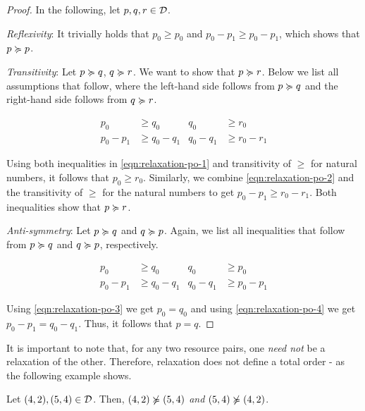 \begin{proof}
   In the following, let \(p, q, r \in \mathcal{D}\).

   \emph{Reflexivity}: It trivially holds that \(p_0 \geq p_0\) and \(p_0 - p_1 \geq p_0 - p_1\), which shows that \(p \succcurlyeq p\).

   \emph{Transitivity}: Let \(p \succcurlyeq q\), \(q \succcurlyeq r\). We want to show that \(p \succcurlyeq r\). Below we list all assumptions that follow, where the left-hand side follows from \(p \succcurlyeq q\) and the right-hand side follows from \(q \succcurlyeq r\).

   \begin{align}
      p_0         &\geq q_0               &  q_0      & \geq r_0 \label{eqn:relaxation-po-1}\\
      p_0 - p_1   &\geq q_0 - q_1         & q_0 - q_1 & \geq r_0 - r_1 \label{eqn:relaxation-po-2}
   \end{align}      

   Using both inequalities in \cref{eqn:relaxation-po-1} and transitivity of \(\geq\) for natural numbers, it follows that \(p_0 \geq r_0\). Similarly, we combine \cref{eqn:relaxation-po-2} and the transitivity of \(\geq\) for the natural numbers to get \(p_0 - p_1 \geq r_0 - r_1\). Both inequalities show that \(p \succcurlyeq r\).

   \emph{Anti-symmetry}: Let \(p \succcurlyeq q\) and \(q \succcurlyeq p\). Again, we list all inequalities that follow from \(p \succcurlyeq q \) and \(q \succcurlyeq p\), respectively.

   \begin{align}
      p_0         &\geq q_0        & q_0        &\geq p_0 \label{eqn:relaxation-po-3}\\
      p_0 - p_1   &\geq q_0 - q_1  & q_0 - q_1  &\geq p_0 - p_1 \label{eqn:relaxation-po-4}
   \end{align}

   Using \cref{eqn:relaxation-po-3} we get \(p_0 = q_0\) and using \cref{eqn:relaxation-po-4} we get \(p_0 - p_1 = q_0 - q_1\). Thus, it follows that \(p = q\).

\end{proof}

It is important to note that, for any two resource pairs, one \emph{need not} be a relaxation of the other. Therefore, relaxation does not define a total order - as the following example shows.

\begin{example}
   Let \((4,2), (5,4) \in \mathcal{D}\). Then, \((4,2) \notrelaxation (5,4)\) \emph{and} \((5,4) \notrelaxation (4,2)\).
\end{example}

